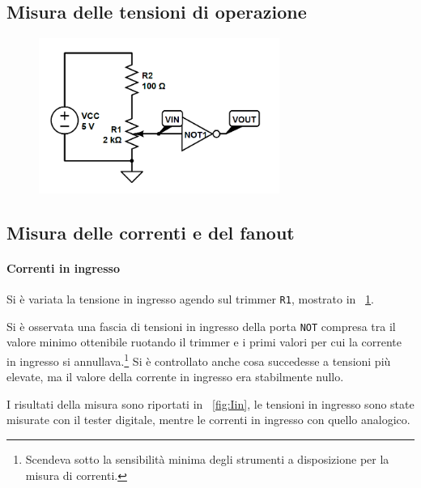 \documentclass[a4paper,10pt]{article}
\def\code#1{\texttt{#1}}
\begin{document}
\subsection{Misura delle tensioni di operazione}

\begin{figure}[H]
	\centering
	\includegraphics[width=0.7\textwidth]{../grafici/NOTin.png}
	\caption{}
	\label{fig:NOTin}
\end{figure}

\subsection{Misura delle correnti e del fanout}

\paragraph{Correnti in ingresso}

Si è variata la tensione in ingresso agendo sul trimmer \code{R1}, mostrato in \figurename{~\ref{fig:NOTin}}.
	
Si è osservata una fascia di tensioni in ingresso della porta \code{NOT} compresa tra il valore minimo ottenibile ruotando il trimmer e i primi valori per cui la corrente in ingresso si annullava.\footnote{\label{nota:I0}Scendeva sotto la sensibilità minima degli strumenti a disposizione per la misura di correnti.} Si è controllato anche cosa succedesse a tensioni più elevate, ma il valore della corrente in ingresso era stabilmente nullo.

I risultati della misura sono riportati in \figurename{~\ref{fig:Iin}}, le tensioni in ingresso sono state misurate con il tester digitale, mentre le correnti in ingresso con quello analogico.
\end{document}
